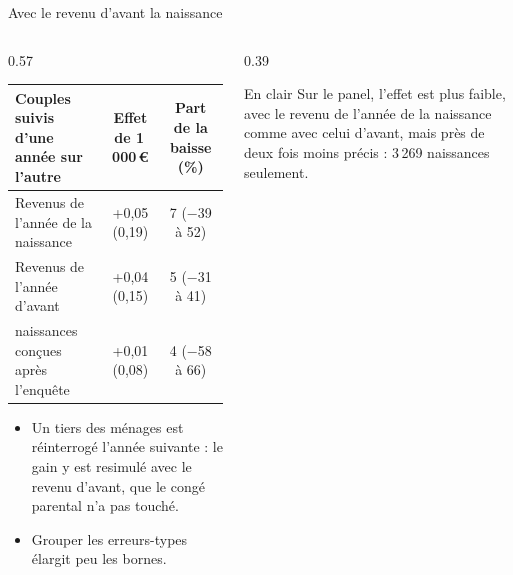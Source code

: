 \documentclass[10pt,aspectratio=169]{beamer}
\begin{document}
\begin{frame}{Avec le revenu d'avant la naissance}
  \begin{columns}[T]
    \begin{column}{0.57\textwidth}
      \scriptsize\setlength{\tabcolsep}{3pt}
      \begin{tabular}{@{}lcc@{}}
        \toprule
        Couples suivis d'une année sur l'autre & Effet de 1\,000\,€ & Part de la baisse (\%) \\
        \midrule
        Revenus de l'année de la naissance & +0,05 (0,19) & 7 ($-$39 à 52) \\
        Revenus de l'année d'avant & +0,04 (0,15) & 5 ($-$31 à 41) \\
        \quad naissances conçues après l'enquête & +0,01 (0,08) & 4 ($-$58 à 66) \\
        \bottomrule
      \end{tabular}
      \vspace{0.25cm}

      \small
      \begin{itemize}\setlength{\itemsep}{0.3em}
        \item Un tiers des ménages est réinterrogé l'année suivante : le gain y est resimulé avec le revenu d'avant, que le congé parental n'a pas touché.
        \item Grouper les erreurs-types élargit peu les bornes.
      \end{itemize}
    \end{column}
    \begin{column}{0.39\textwidth}
      \vspace{0.1cm}
      \begin{callout}[tdtenavy]{En clair}
        \footnotesize\RaggedRight Sur le panel, l'effet est plus faible, avec le revenu de l'année de la naissance comme avec celui d'avant, mais près de deux fois moins précis : 3\,269 naissances seulement.
      \end{callout}
    \end{column}
  \end{columns}
\end{frame}
\end{document}
